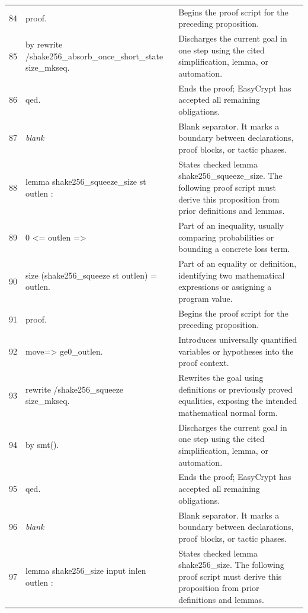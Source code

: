\documentclass[10pt]{article}
\begin{document}
\begin{longtable}{r L{0.53\textwidth} L{0.37\textwidth}}
84 & {\ttfamily\scriptsize proof.} & Begins the proof script for the preceding proposition. \\
85 & {\ttfamily\scriptsize by rewrite /shake256\_absorb\_once\_short\_state size\_mkseq.} & Discharges the current goal in one step using the cited simplification, lemma, or automation. \\
86 & {\ttfamily\scriptsize qed.} & Ends the proof; EasyCrypt has accepted all remaining obligations. \\
87 & {\ttfamily\scriptsize \emph{blank}} & Blank separator.  It marks a boundary between declarations, proof blocks, or tactic phases. \\
88 & {\ttfamily\scriptsize lemma shake256\_squeeze\_size st outlen :} & States checked lemma shake256\_squeeze\_size.  The following proof script must derive this proposition from prior definitions and lemmas. \\
89 & {\ttfamily\scriptsize   0 <= outlen =>} & Part of an inequality, usually comparing probabilities or bounding a concrete loss term. \\
90 & {\ttfamily\scriptsize   size (shake256\_squeeze st outlen) = outlen.} & Part of an equality or definition, identifying two mathematical expressions or assigning a program value. \\
91 & {\ttfamily\scriptsize proof.} & Begins the proof script for the preceding proposition. \\
92 & {\ttfamily\scriptsize move=> ge0\_outlen.} & Introduces universally quantified variables or hypotheses into the proof context. \\
93 & {\ttfamily\scriptsize rewrite /shake256\_squeeze size\_mkseq.} & Rewrites the goal using definitions or previously proved equalities, exposing the intended mathematical normal form. \\
94 & {\ttfamily\scriptsize by smt().} & Discharges the current goal in one step using the cited simplification, lemma, or automation. \\
95 & {\ttfamily\scriptsize qed.} & Ends the proof; EasyCrypt has accepted all remaining obligations. \\
96 & {\ttfamily\scriptsize \emph{blank}} & Blank separator.  It marks a boundary between declarations, proof blocks, or tactic phases. \\
97 & {\ttfamily\scriptsize lemma shake256\_size input inlen outlen :} & States checked lemma shake256\_size.  The following proof script must derive this proposition from prior definitions and lemmas. \\

\end{longtable}
\end{document}
